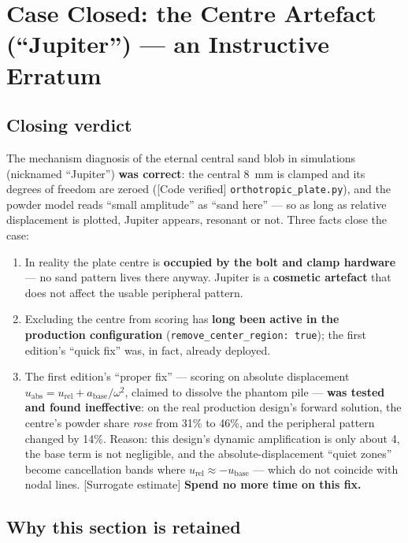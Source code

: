 \documentclass[11pt,a4paper]{article}
\newcommand{\code}[1]{\texttt{#1}}
\begin{document}
\section{Case Closed: the Centre Artefact (``Jupiter'') --- an Instructive Erratum}

\subsection{Closing verdict}

The mechanism diagnosis of the eternal central sand blob in simulations (nicknamed ``Jupiter'') \textbf{was correct}: the central 8~mm is clamped and its degrees of freedom are zeroed ([Code verified] \code{orthotropic\_plate.py}), and the powder model reads ``small amplitude'' as ``sand here'' --- so as long as relative displacement is plotted, Jupiter appears, resonant or not. Three facts close the case:

\begin{enumerate}[leftmargin=2em]
\item In reality the plate centre is \textbf{occupied by the bolt and clamp hardware} --- no sand pattern lives there anyway. Jupiter is a \textbf{cosmetic artefact} that does not affect the usable peripheral pattern.
\item Excluding the centre from scoring has \textbf{long been active in the production configuration} (\code{remove\_center\_region: true}); the first edition's ``quick fix'' was, in fact, already deployed.
\item The first edition's ``proper fix'' --- scoring on absolute displacement $u_{\mathrm{abs}} = u_{\mathrm{rel}} + a_{\mathrm{base}}/\omega^2$, claimed to dissolve the phantom pile --- \textbf{was tested and found ineffective}: on the real production design's forward solution, the centre's powder share \emph{rose} from 31\% to 46\%, and the peripheral pattern changed by 14\%. Reason: this design's dynamic amplification is only about 4, the base term is not negligible, and the absolute-displacement ``quiet zones'' become cancellation bands where $u_{\mathrm{rel}}\approx -u_{\mathrm{base}}$ --- which do not coincide with nodal lines. [Surrogate estimate] \textbf{Spend no more time on this fix.}
\end{enumerate}

\subsection{Why this section is retained}
\end{document}
